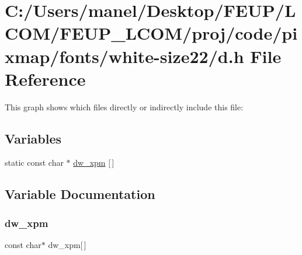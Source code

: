 \hypertarget{white-size22_2d_8h}{}\section{C\+:/\+Users/manel/\+Desktop/\+F\+E\+U\+P/\+L\+C\+O\+M/\+F\+E\+U\+P\+\_\+\+L\+C\+O\+M/proj/code/pixmap/fonts/white-\/size22/d.h File Reference}
\label{white-size22_2d_8h}
This graph shows which files directly or indirectly include this file\+:
\subsection*{Variables}
\begin{DoxyCompactItemize}
\item 
static const char $\ast$ \mbox{\hyperlink{white-size22_2d_8h_a6cc836d6c15d0b8969bb3ce73d6a6380}{dw\+\_\+xpm}} \mbox{[}$\,$\mbox{]}
\end{DoxyCompactItemize}


\subsection{Variable Documentation}
\mbox{\label{white-size22_2d_8h_a6cc836d6c15d0b8969bb3ce73d6a6380}} 
\subsubsection{\texorpdfstring{dw\_xpm}{dw\_xpm}}
{\footnotesize\ttfamily const char$\ast$ dw\+\_\+xpm\mbox{[}$\,$\mbox{]}\hspace{0.3cm}{\ttfamily [static]}}

